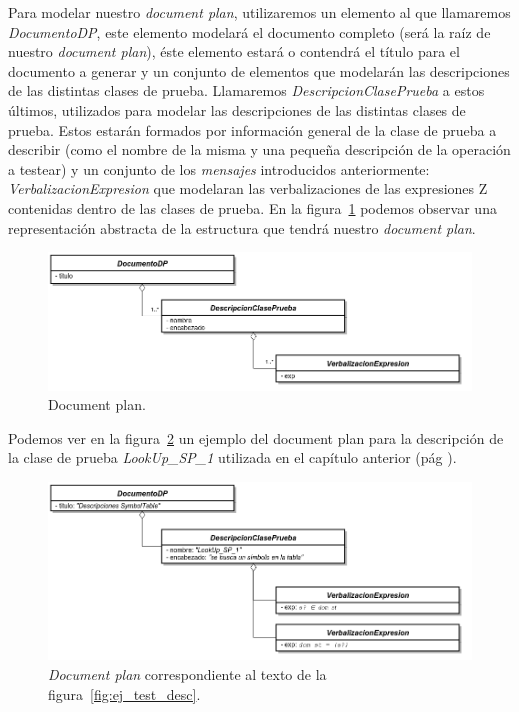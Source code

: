Para modelar nuestro \emph{document plan}, utilizaremos un elemento al que llamaremos \emph{DocumentoDP}, este elemento modelará el documento completo (será la raíz de nuestro \emph{document plan}), éste elemento estará o contendrá el título para el documento a generar y un conjunto de elementos que modelarán las descripciones de las distintas clases de prueba. Llamaremos \emph{DescripcionClasePrueba} a estos últimos, utilizados para modelar las descripciones de las distintas clases de prueba. Estos estarán formados por información general de la clase de prueba a describir (como el nombre de la misma y una pequeña descripción de la operación a testear) y un conjunto de los \emph{mensajes} introducidos anteriormente: \emph{VerbalizacionExpresion} que modelaran las verbalizaciones de las expresiones Z contenidas dentro de las clases de prueba. En la figura~\ref{fig:png_document_plan} podemos observar una representación abstracta de la estructura que tendrá nuestro \emph{document plan}.

\begin{figure}[H]
  	\centering
	\includegraphics[scale=0.4]{img/document_plan.png}
	\caption{Document plan.}
  	\label{fig:png_document_plan}
\end{figure}

Podemos ver en la figura~\ref{fig:png_document_plan_ej} un ejemplo del document plan para la descripción de la clase de prueba \emph{LookUp\_SP\_1} utilizada en el capítulo anterior (pág \pageref{fig:ej_test_desc}). 

\begin{figure}[H]
  	\centering
	\includegraphics[scale=0.4]{img/document_plan_ej.png}
	\caption{\textit{Document plan} correspondiente al texto de la figura~\ref{fig:ej_test_desc}.}
  	\label{fig:png_document_plan_ej}
\end{figure}

